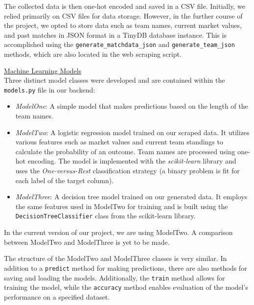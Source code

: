 \documentclass[conference,a4paper,flushend]{cs-techrep}
\begin{document}
The collected data is then one-hot encoded and saved in a CSV file. Initially, we relied primarily on CSV files for data storage. However, in the further course of the project, we opted to store data such as team names, current market values, and past matches in JSON format in a TinyDB database instance. This is accomplished using the \texttt{generate\_matchdata\_json} and \texttt{generate\_team\_json} methods, which are also located in the web scraping script.


\vspace{0.15cm}
\underline{Machine Learning Models}\vspace{0.1cm}\\
Three distinct model classes were developed and are contained within the \texttt{models.py} file in our backend:

\begin{itemize}
    \item \textit{ModelOne}: A simple model that makes predictions based on the length of the team names.
    \item \textit{ModelTwo}: A logistic regression model trained on our scraped data. It utilizes various features such as market values and current team standings to calculate the probability of an outcome. Team names are processed using one-hot encoding. The model is implemented with the \emph{scikit-learn} library \cite{noauthor_scikit-learn_nodate} and uses the \emph{One-versus-Rest} classification strategy (a binary problem is fit for each label of the target column).
    \item \textit{ModelThree}: A decision tree model trained on our generated data. It employs the same features used in ModelTwo for training and is built using the \verb|DecisionTreeClassifier| class from the scikit-learn library.
\end{itemize}

In the current version of our project, we are using ModelTwo. A comparison between ModelTwo and ModelThree is yet to be made.



The structure of the ModelTwo and ModelThree classes is very similar. In addition to a \texttt{predict} method for making predictions, there are also methods for saving and loading the models. Additionally, the \texttt{train} method allows for training the model, while the \texttt{accuracy} method enables evaluation of the model's performance on a specified dataset.
\end{document}
